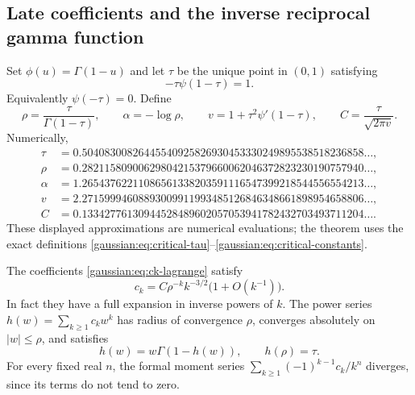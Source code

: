 \subsection{Late coefficients and the inverse reciprocal gamma function}
Set $\phi(u)=\Gamma(1-u)$ and let $\tau$ be the unique point in $(0,1)$
satisfying
\begin{equation}
 -\tau\psi(1-\tau)=1.
 \label{gaussian:eq:critical-tau}
\end{equation}
Equivalently $\psi(-\tau)=0$.  Define
\begin{equation}
 \rho=\frac{\tau}{\Gamma(1-\tau)},\qquad
 \alpha=-\log\rho,\qquad
 v=1+\tau^2\psi'(1-\tau),\qquad
 C=\frac{\tau}{\sqrt{2\pi v}}.
 \label{gaussian:eq:critical-constants}
\end{equation}
Numerically,
\begin{align*}
 \tau&=0.50408300826445540925826930453330249895538518236858\ldots,\\
 \rho&=0.28211580900629804215379660062046372823230190757940\ldots,\\
 \alpha&=1.26543762211086561338203591116547399218544556554213\ldots,\\
 v&=2.27159994608893009911993485126846348661898954658806\ldots,\\
 C&=0.13342776130944528489602057053941782432703493711204\ldots.
\end{align*}
These displayed approximations are numerical evaluations; the theorem uses
the exact definitions \eqref{gaussian:eq:critical-tau}--\eqref{gaussian:eq:critical-constants}.

\begin{theorem}
\label{gaussian:thm:late-coefficients}
The coefficients \eqref{gaussian:eq:ck-lagrange} satisfy
\begin{equation}
 c_k=C\rho^{-k}k^{-3/2}\bigl(1+O(k^{-1})\bigr).
 \label{gaussian:eq:ck-asymptotic}
\end{equation}
In fact they have a full expansion in inverse powers of $k$.
The power series $h(w)=\sum_{k\ge1}c_kw^k$ has radius of convergence
$\rho$, converges absolutely on $|w|\le\rho$, and satisfies
\[
 h(w)=w\Gamma(1-h(w)),\qquad h(\rho)=\tau.
\]
For every fixed real $n$, the formal moment series
$\sum_{k\ge1}(-1)^{k-1}c_k/k^n$ diverges, since its terms do not tend to zero.
\end{theorem}

